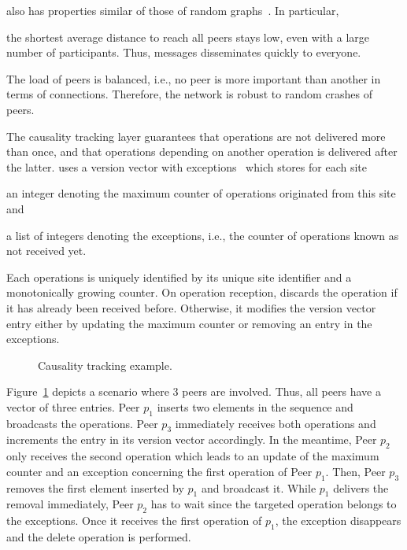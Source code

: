 \begin{asparadesc}
  \SPRAY also has properties similar of those of random
  graphs~\cite{erdos1959random}. In particular,
  \begin{inparaenum}[(i)]
  \item the shortest average distance to reach all peers stays low, even with a
    large number of participants. Thus, messages disseminates quickly to
    everyone.
  \item The load of peers is balanced, i.e., no peer is more important than
    another in terms of connections. Therefore, the network is robust to random
    crashes of peers.
  \end{inparaenum}

\item [The causality tracking layer] guarantees that operations are not
  delivered more than once, and that operations depending on another operation
  is delivered after the latter. \CRATE uses a version vector with
  exceptions~\cite{malkhi2007concise} which stores for each
  site
  \begin{inparaenum}[(i)]
  \item an integer denoting the maximum counter of operations originated from
    this site and
  \item a list of integers denoting the exceptions, i.e., the counter of
    operations known as not received yet.
  \end{inparaenum}

  Each operations is uniquely identified by its unique site identifier and a
  monotonically growing counter. On operation reception, \CRATE discards the
  operation if it has already been received before. Otherwise, it modifies the
  version vector entry either by updating the maximum counter or removing an
  entry in the exceptions.

  \begin{figure}
    
    \caption{\label{fig:timeline}Causality tracking example.}
  \end{figure}

  Figure~\ref{fig:timeline} depicts a scenario where 3 peers are involved. Thus,
  all peers have a vector of three entries. Peer $p_1$ inserts two elements in
  the sequence and broadcasts the operations. Peer $p_3$ immediately receives
  both operations and increments the entry in its version vector accordingly.
  In the meantime, Peer $p_2$ only receives the second operation which leads to
  an update of the maximum counter and an exception concerning the first
  operation of Peer $p_1$. Then, Peer $p_3$ removes the first element inserted
  by $p_1$ and broadcast it. While $p_1$ delivers the removal immediately, Peer
  $p_2$ has to wait since the targeted operation belongs to the exceptions. Once
  it receives the first operation of $p_1$, the exception disappears and the
  delete operation is performed.


\end{asparadesc}
